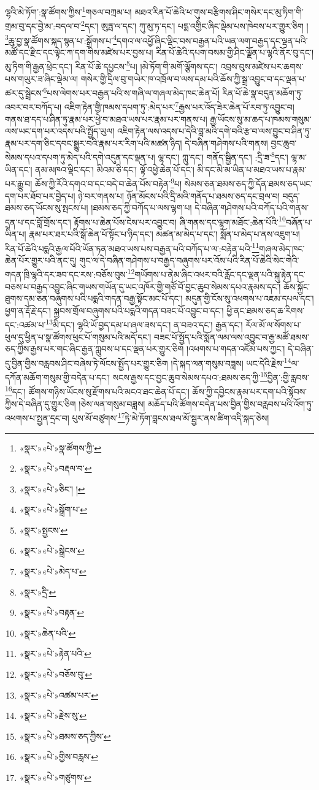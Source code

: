 ལྷའི་མེ་ཏོག་:སྣ་ཚོགས་ཀྱིས་\footnote{«སྣར་»«པེ་»སྣ་ཚོགས་ཀྱི་}གཅལ་བཀྲམ་པ། མཐའ་རིན་པོ་ཆེའི་ཕ་གུས་བརྩིགས་ཤིང་གསེར་དང་མུ་ཏིག་གི་གྲམ་བུ་དང་བྱེ་མ་:བདལ་བ་\footnote{«སྣར་»«པེ་»བརྡལ་བ་}དང་། ཨུཏྤ་ལ་དང་། ཀུ་མུ་ཏ་དང་། པདྨ་འགྱིང་ཞིང་ལྡེམ་པས་ཁེབས་པར་གྱུར་ཅིག །\footnote{«སྣར་»«པེ་»ཅིང་། །}ཆུ་བྱ་སྣ་ཚོགས་སྐད་སྙན་པ་:སྒྲོགས་པ་\footnote{«སྣར་»«པེ་»སྒྲོག་པ་}དགའ་ལ་འཕྱོ་ཞིང་ལྡིང་བས་བརྒྱན་པའི་ཡན་ལག་བརྒྱད་དང་ལྡན་པའི་མཚོ་དང་རྫིང་དང་ལྟེང་ཀ་དག་གིས་མཛེས་པར་བྱས་པ། རིན་པོ་ཆེའི་དཔག་བསམ་གྱི་ཤིང་ལྗོན་པ་ལྷའི་ནོར་བུ་དང་། མུ་ཏིག་གི་རྒྱན་ཕྲེང་དང་། རིན་པོ་ཆེ་དཔྱངས་\footnote{«སྣར་»སྤྱངས་}པ། །མེ་ཏོག་གི་མགོ་ལྕོགས་དང་། འབྲས་བུས་མཛེས་པར་ཆགས་པས་གཡུར་ཟ་ཞིང་ལྡེམ་ལ། གསེར་གྱི་དྲིལ་བུ་གཡེར་ཁ་འཁྲོལ་བ་ལས་དམ་པའི་ཆོས་ཀྱི་སྒྲ་འབྱུང་བ་དང་ལྡན་པ་ཚར་དུ་སྦྲེངས་\footnote{«སྣར་»«པེ་»སྒྲེངས་}པས་ལེགས་པར་བརྒྱན་པའི་ས་གཞི་ལ་གཞལ་མེད་ཁང་ཆེན་པོ། རིན་པོ་ཆེ་སྣ་བདུན་མཆོག་ཏུ་འབར་བར་བཀོད་པ། འཇིག་རྟེན་གྱི་ཁམས་དཔག་ཏུ་:མེད་པར་\footnote{«སྣར་»«པེ་»མེད་པ་}རྒྱས་པར་འོད་ཟེར་ཆེན་པོ་རབ་ཏུ་འབྱུང་བ། གནས་ཐ་དད་པ་ཤིན་ཏུ་རྣམ་པར་ཕྱེ་བ་མཐའ་ཡས་པར་རྣམ་པར་གནས་པ། རྒྱ་ཡོངས་སུ་མ་ཆད་པ་ཁམས་གསུམ་ལས་ཡང་དག་པར་འདས་པའི་སྤྱོད་ཡུལ། འཇིག་རྟེན་ལས་འདས་པ་དེའི་བླ་མའི་དགེ་བའི་རྩ་བ་ལས་བྱུང་བ་ཤིན་ཏུ་རྣམ་པར་དག་ཅིང་དབང་སྒྱུར་བའི་རྣམ་པར་རིག་པའི་མཚན་ཉིད། དེ་བཞིན་གཤེགས་པའི་གནས། བྱང་ཆུབ་སེམས་དཔའ་དཔག་ཏུ་མེད་པའི་དགེ་འདུན་དང་ལྡན་པ། ལྷ་དང་། ཀླུ་དང་། གནོད་སྦྱིན་དང་། :དྲི་ཟ་\footnote{«སྣར་»དྲི་}དང་། ལྷ་མ་ཡིན་དང་། ནམ་མཁའ་ལྡིང་དང་། མིའམ་ཅི་དང་། ལྟོ་འཕྱེ་ཆེན་པོ་དང་། མི་དང་མི་མ་ཡིན་པ་མཐའ་ཡས་པ་རྣམ་པར་རྒྱུ་བ། ཆོས་ཀྱི་རོའི་དགའ་བ་དང་བདེ་བ་ཆེན་པོས་བརྟེན་\footnote{«སྣར་»«པེ་»བརྟན་}པ། སེམས་ཅན་ཐམས་ཅད་ཀྱི་དོན་ཐམས་ཅད་ཡང་དག་པར་ཐོབ་པར་བྱེད་པ། ཉེ་བར་གནས་པ། ཉོན་མོངས་པའི་དྲི་མའི་གནོད་པ་ཐམས་ཅད་དང་བྲལ་བ། བདུད་ཐམས་ཅད་ཡོངས་སུ་སྤངས་པ། །ཐམས་ཅད་ཀྱི་བཀོད་པ་ལས་ལྷག་པ། དེ་བཞིན་གཤེགས་པའི་བཀོད་པའི་གནས་དྲན་པ་དང་བློ་གྲོས་དང་། རྟོགས་པ་ཆེན་པོས་ངེས་པར་འབྱུང་བ། ཞི་གནས་དང་ལྷག་མཐོང་:ཆེན་པོའི་\footnote{«སྣར་»ཆེན་པའི་}བཞོན་པ་ཡིན་པ། རྣམ་པར་ཐར་པའི་སྒོ་ཆེན་པོ་སྟོང་པ་ཉིད་དང་། མཚན་མ་མེད་པ་དང་། སྨོན་པ་མེད་པ་ནས་འཇུག་པ། རིན་པོ་ཆེའི་པདྨའི་རྒྱལ་པོའི་ཡོན་ཏན་མཐའ་ཡས་པས་བརྒྱན་པའི་བཀོད་པ་ལ་:བརྟེན་པའི་\footnote{«སྣར་»«པེ་»རྟེན་པའི་}གཞལ་མེད་ཁང་ཆེན་པོར་གྱུར་པའི་ནང་དུ། གུང་ལ་དེ་བཞིན་གཤེགས་པ་བརྒྱད་བཞུགས་པར་འོས་པའི་རིན་པོ་ཆེའི་སེང་གེའི་གདན་ཁྲི་ལྷའི་དར་ཟབ་དང་རས་:བཅོས་བུས་\footnote{«སྣར་»«པེ་»བཅོས་བུ་}གཡོགས་པ་ནེམ་ཞིང་འཕར་བའི་རློང་དང་ལྡན་པའི་སྐུ་རྟེན་དང་བཅས་པ་བརྒྱད་འབྱུང་ཞིང་གཡས་གཡོན་དུ་ཡང་འཁོར་གྱི་གཙོ་བོ་བྱང་ཆུབ་སེམས་དཔའ་རྣམས་དང་། ཆོས་སྐྱོང་ཐུགས་དམ་ཅན་བཞུགས་པའི་པདྨའི་གདན་བརྒྱ་སྟོང་མང་པོ་དང་། མདུན་གྱི་ངོས་སུ་འཕགས་པ་འཇམ་དཔལ་དང་། ཕྱག་ན་རྡོ་རྗེ་དང་། སྐྱབས་གྲོལ་བཞུགས་པའི་པདྨའི་གདན་བཟང་པོ་འབྱུང་བ་དང་། ཕྱི་ནང་ཐམས་ཅད་ཆ་རིགས་དང་:འཚམ་པ་\footnote{«སྣར་»«པེ་»འཚམ་པར་}མི་དང་། ལྷའི་ཡོ་བྱད་དམ་པ་ཞལ་ཟས་དང་། ན་བཟའ་དང་། རྒྱན་དང་། རོལ་མོ་ལ་སོགས་པ་ཕུལ་དུ་ཕྱིན་པ་སྣ་ཚོགས་ཕུང་པོ་གསུམ་པའི་མདོ་དང་། བཟང་པོ་སྤྱོད་པའི་སྨོན་ལམ་ལས་འབྱུང་བ་རྒྱ་མཚོ་ཐམས་ཅད་ཀྱིས་རྒྱས་པར་གང་ཞིང་རྒྱན་ཀླུབས་པ་དང་ལྡན་པར་གྱུར་ཅིག །འཕགས་པ་གདན་འཛོམ་པས་ཀྱང་། དེ་བཞིན་དུ་བྱིན་གྱིས་བརླབས་ཤིང་བཞེས་ཏེ་ལོངས་སྤྱོད་པར་གྱུར་ཅིག །དེ་སྐད་ལན་གསུམ་བཟླས། ཡང་དེའི་རྗེས་\footnote{«སྣར་»«པེ་»རྗེས་སུ་}ལ་དཀོན་མཆོག་གསུམ་གྱི་བདེན་པ་དང་། སངས་རྒྱས་དང་བྱང་ཆུབ་སེམས་དཔའ་:ཐམས་ཅད་ཀྱི་\footnote{«སྣར་»«པེ་»ཐམས་ཅད་ཀྱིས་}བྱིན་:གྱི་རླབས་\footnote{«སྣར་»«པེ་»གྱིས་བརླས་}དང་། ཚོགས་གཉིས་ཡོངས་སུ་རྫོགས་པའི་མངའ་ཐང་ཆེན་པོ་དང་། ཆོས་ཀྱི་དབྱིངས་རྣམ་པར་དག་པའི་སྟོབས་ཀྱིས་དེ་བཞིན་དུ་གྱུར་ཅིག །ཅེས་ལན་གསུམ་བཟླས། མཆོད་པའི་ཚོགས་བདེན་པས་བྱིན་གྱིས་བརླབས་པའི་འོག་ཏུ་འཕགས་པ་སྤྱན་དྲང་བ། པུས་མོ་བཙུགས་\footnote{«སྣར་»«པེ་»གཙུགས་}ཏེ་མེ་ཏོག་བླངས་ཐལ་མོ་སྦྱར་ནས་ཚིག་འདི་སྐད་ཅེས། 